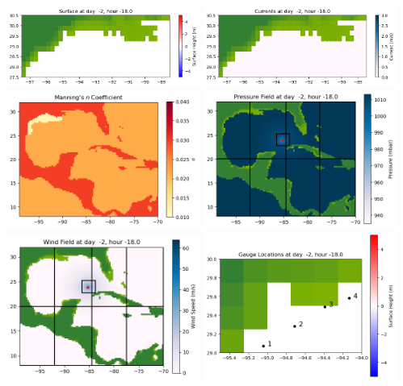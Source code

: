 \documentclass[11pt]{article}
\begin{document}
\vskip 10pt 
\includegraphics[width=0.475\textwidth]{frame0001fig1003.png}
\includegraphics[width=0.475\textwidth]{frame0001fig1004.png}
\vskip 10pt 
\includegraphics[width=0.475\textwidth]{frame0001fig1005.png}
\includegraphics[width=0.475\textwidth]{frame0001fig1006.png}
\vskip 10pt 
\includegraphics[width=0.475\textwidth]{frame0001fig1007.png}
\includegraphics[width=0.475\textwidth]{frame0001fig1008.png}
\end{document}
